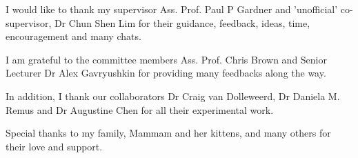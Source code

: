\begin{acknowledgements}
I would like to thank my supervisor Ass. Prof. Paul P Gardner and 'unofficial' co-supervisor, Dr Chun Shen Lim for their guidance, feedback, ideas, time, encouragement and many chats. 

I am grateful to the committee members Ass. Prof. Chris Brown and Senior Lecturer Dr Alex Gavryushkin for providing many feedbacks along the way. 

In addition, I thank our collaborators Dr Craig van Dolleweerd, Dr Daniela M. Remus and Dr Augustine Chen for all their experimental work.

Special thanks to my family, Mammam and her kittens, and many others for their love and support.

\end{acknowledgements}